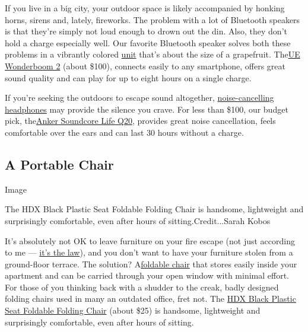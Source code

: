 If you live in a big city, your outdoor space is likely accompanied by
honking horns, sirens and, lately, fireworks. The problem with a lot of
Bluetooth speakers is that they're simply not loud enough to drown out
the din. Also, they don't hold a charge especially well. Our favorite
Bluetooth speaker solves both these problems in a vibrantly colored
\href{https://www.nytimes3xbfgragh.onion/wirecutter/reviews/best-bluetooth-speaker/?utm_source=nytimes\&utm_medium=referral\&utm_campaign=outdoor-space}{unit}
that's about the size of a grapefruit.
The\href{https://www.nytimes3xbfgragh.onion/wirecutter/reviews/best-bluetooth-speaker/?utm_source=nytimes\&utm_medium=referral\&utm_campaign=outdoor-space\#our-pick-ue-wonderboom-2}{UE
Wonderboom 2} (about \$100), connects easily to any smartphone, offers
great sound quality and can play for up to eight hours on a single
charge.

If you're seeking the outdoors to escape sound altogether,
\href{https://www.nytimes3xbfgragh.onion/wirecutter/reviews/best-noise-cancelling-headphones/?utm_source=nytimes\&utm_medium=referral\&utm_campaign=outdoor-space}{noise-cancelling
headphones} may provide the silence you crave. For less than \$100, our
budget pick,
the\href{https://www.nytimes3xbfgragh.onion/wirecutter/reviews/best-noise-cancelling-headphones/\#best-budget-over-ear-noise-cancelling-headphones-anker-soundcore-life-q20}{Anker
Soundcore Life Q20}, provides great noise cancellation, feels
comfortable over the ears and can last 30 hours without a charge.

\hypertarget{a-portable-chair}{%
\subsection{A Portable Chair}\label{a-portable-chair}}

Image

 The HDX Black Plastic Seat Foldable Folding Chair is handsome,
lightweight and surprisingly comfortable, even after hours of
sitting.Credit...Sarah Kobos

It's absolutely not OK to leave furniture on your fire escape (not just
according to me ---
\href{https://www.nytimes3xbfgragh.onion/2017/10/22/realestate/can-a-neighbor-keep-flowerpots-on-a-fire-escape.html}{it's
the law}), and you don't want to have your furniture stolen from a
ground-floor terrace. The solution?
A\href{https://www.nytimes3xbfgragh.onion/wirecutter/reviews/best-folding-chairs/?utm_source=nytimes\&utm_medium=referral\&utm_campaign=outdoor-space}{foldable
chair} that stores easily inside your apartment and can be carried
through your open window with minimal effort. For those of you thinking
back with a shudder to the creak, badly designed folding chairs used in
many an outdated office, fret not. The
\href{https://www.nytimes3xbfgragh.onion/wirecutter/reviews/best-folding-chairs/?utm_source=nytimes\&utm_medium=referral\&utm_campaign=outdoor-space\#our-pick-hdx-black-plastic-seat-foldable-folding-chair}{HDX
Black Plastic Seat Foldable Folding Chair} (about \$25) is handsome,
lightweight and surprisingly comfortable, even after hours of sitting.


